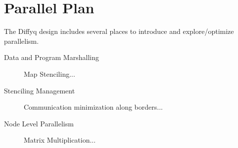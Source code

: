 \section{Parallel Plan}

The Diffyq design includes several places to introduce and explore/optimize parallelism.

\begin{description}
\item[Data and Program Marshalling] Map Stenciling...
\item[Stenciling Management] Communication minimization along borders...
\item[Node Level Parallelism] Matrix Multiplication...
\end{description}


